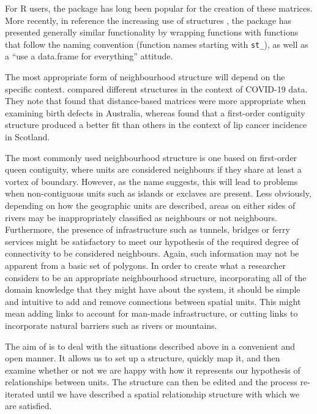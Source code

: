 For R users, the  package \citep{spdep} has long been popular for the
creation of these matrices. More recently, in reference the increasing use of  structures \citep{sf}, the  package \citep{sfdep} has presented generally similar functionality by wrapping  functions with functions that follow the  naming convention (function names starting with \texttt{st\_}), as well as a ``use a data.frame for everything'' attitude.

The most appropriate form of neighbourhood structure will depend on the specific context. \citet{BrizRedn2021} compared different structures in the context of COVID-19 data. They note that \citet{Earnest2007} found that distance-based matrices were more appropriate when examining birth defects in Australia, whereas \citet{Duncan2017} found that a first-order contiguity structure produced a better fit than others in the context of lip cancer incidence in Scotland.

The most commonly used neighbourhood structure is one based on first-order queen contiguity, where units are considered neighbours if they
share at least a vortex of boundary. However, as the name suggests, this
will lead to problems when non-contiguous units such as islands or
exclaves are present. Less obviously, depending on how the geographic
units are described, areas on either sides of rivers may be
inappropriately classified as neighbours or not neighbours. Furthermore,
the presence of infrastructure such as tunnels, bridges or ferry
services might be satisfactory to meet our hypothesis of the required
degree of connectivity to be considered neighbours. Again, such information may not be apparent from a basic set of polygons. In order to create what a researcher considers to be an appropriate neighbourhood structure, incorporating all of the domain knowledge that they might have about the system, it should be simple and intuitive to add and remove connections between spatial units. This might mean adding links to account for man-made infrastructure, or cutting links to incorporate natural barriers such as rivers or mountains.

The aim of  \citep{sfislands} is to deal with the situations described above in a
convenient and open manner. It allows us to set up a structure, quickly
map it, and then examine whether or not we are happy with how it represents our hypothesis of relationships between units. The structure can then be edited and the process re-iterated until we have described a
spatial relationship structure with which we are satisfied.

